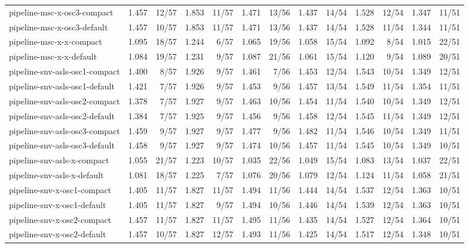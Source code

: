 \begin{tabular}{lrrrrrrrrrrrr}
pipeline-msc-x-osc3-compact & 1.457 & 12/57 & 1.853 & 11/57 & 1.471 & 13/56 & 1.437 & 14/54 & 1.528 & 12/54 & 1.347 & 11/51 \\
pipeline-msc-x-osc3-default & 1.457 & 10/57 & 1.853 & 11/57 & 1.471 & 13/56 & 1.437 & 14/54 & 1.528 & 11/54 & 1.344 & 11/51 \\
pipeline-msc-x-x-compact & 1.095 & 18/57 & 1.244 & 6/57 & 1.065 & 19/56 & 1.058 & 15/54 & 1.092 & 8/54 & 1.015 & 22/51 \\
pipeline-msc-x-x-default & 1.084 & 19/57 & 1.231 & 9/57 & 1.087 & 21/56 & 1.061 & 15/54 & 1.120 & 9/54 & 1.089 & 20/51 \\
pipeline-snv-asls-osc1-compact & 1.400 & 8/57 & 1.926 & 9/57 & 1.461 & 7/56 & 1.453 & 12/54 & 1.543 & 10/54 & 1.349 & 12/51 \\
pipeline-snv-asls-osc1-default & 1.421 & 7/57 & 1.926 & 9/57 & 1.453 & 9/56 & 1.457 & 13/54 & 1.549 & 11/54 & 1.354 & 11/51 \\
pipeline-snv-asls-osc2-compact & 1.378 & 7/57 & 1.927 & 9/57 & 1.463 & 10/56 & 1.454 & 11/54 & 1.540 & 10/54 & 1.349 & 12/51 \\
pipeline-snv-asls-osc2-default & 1.384 & 7/57 & 1.925 & 9/57 & 1.456 & 9/56 & 1.458 & 12/54 & 1.545 & 11/54 & 1.349 & 12/51 \\
pipeline-snv-asls-osc3-compact & 1.459 & 9/57 & 1.927 & 9/57 & 1.477 & 9/56 & 1.482 & 11/54 & 1.546 & 10/54 & 1.349 & 11/51 \\
pipeline-snv-asls-osc3-default & 1.458 & 9/57 & 1.927 & 9/57 & 1.474 & 10/56 & 1.457 & 11/54 & 1.545 & 10/54 & 1.349 & 10/51 \\
pipeline-snv-asls-x-compact & 1.055 & 21/57 & 1.223 & 10/57 & 1.035 & 22/56 & 1.049 & 15/54 & 1.083 & 13/54 & 1.037 & 22/51 \\
pipeline-snv-asls-x-default & 1.081 & 18/57 & 1.225 & 7/57 & 1.076 & 20/56 & 1.079 & 12/54 & 1.124 & 11/54 & 1.058 & 21/51 \\
pipeline-snv-x-osc1-compact & 1.405 & 11/57 & 1.827 & 11/57 & 1.494 & 11/56 & 1.444 & 14/54 & 1.537 & 12/54 & 1.363 & 10/51 \\
pipeline-snv-x-osc1-default & 1.405 & 11/57 & 1.827 & 9/57 & 1.494 & 10/56 & 1.446 & 14/54 & 1.539 & 12/54 & 1.363 & 10/51 \\
pipeline-snv-x-osc2-compact & 1.457 & 11/57 & 1.827 & 11/57 & 1.495 & 11/56 & 1.435 & 14/54 & 1.527 & 12/54 & 1.364 & 10/51 \\
pipeline-snv-x-osc2-default & 1.457 & 10/57 & 1.827 & 12/57 & 1.493 & 11/56 & 1.425 & 14/54 & 1.517 & 12/54 & 1.348 & 10/51 \\

\end{tabular}
